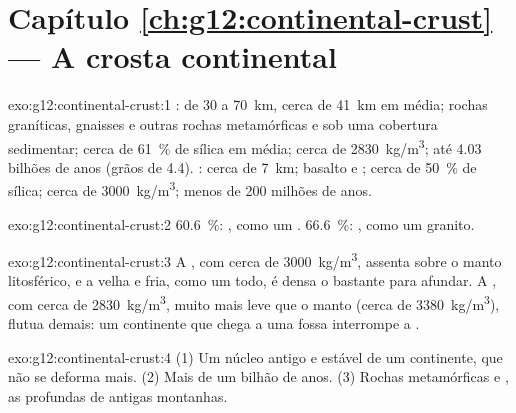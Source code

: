 \section*{Capítulo \ref{ch:g12:continental-crust} --- A crosta continental}

\begin{solution}{exo:g12:continental-crust:1}
: de 30 a \qty{70}{km}, cerca de \qty{41}{km} em média;
rochas graníticas, gnaisses e outras rochas metamórficas e  sob
uma cobertura sedimentar; cerca de \qty{61}{\percent} de sílica em média;
cerca de \qty{2830}{kg/m^3}; até 4.03 bilhões de anos (grãos de 4.4).
: cerca de \qty{7}{km}; basalto e ; cerca de
\qty{50}{\percent} de sílica; cerca de \qty{3000}{kg/m^3}; menos de 200
milhões de anos.
\end{solution}

\begin{solution}{exo:g12:continental-crust:2}
\qty{60.6}{\percent}: , como um . \qty{66.6}{\percent}:
, como um granito.
\end{solution}

\begin{solution}{exo:g12:continental-crust:3}
A , com cerca de \qty{3000}{kg/m^3}, assenta sobre o manto
litosférico, e a  velha e fria, como um todo, é densa o
bastante para afundar. A , com cerca de
\qty{2830}{kg/m^3}, muito mais leve que o manto (cerca de
\qty{3380}{kg/m^3}), flutua demais: um continente que chega a uma fossa
interrompe a .
\end{solution}

\begin{solution}{exo:g12:continental-crust:4}
(1) Um núcleo antigo e estável de um continente, que não se deforma mais.
(2) Mais de um bilhão de anos. (3) Rochas metamórficas e , as
 profundas de antigas montanhas.
\end{solution}

